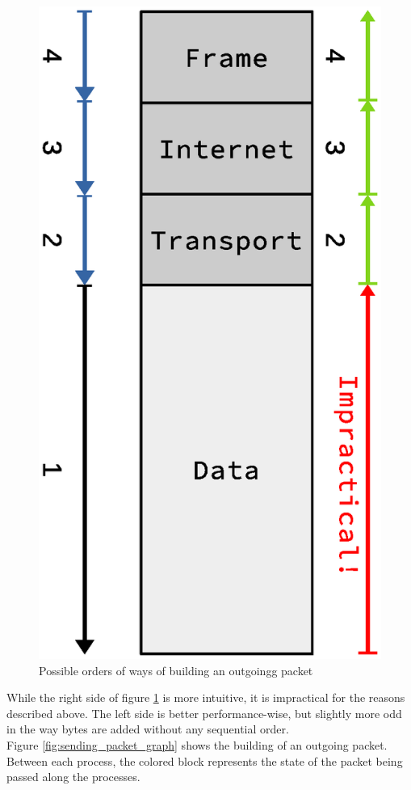\begin{figure}
    \centering
    \includegraphics[scale=0.45]{design/sending_packet_order.eps}
    \caption{Possible orders of ways of building an outgoingg packet}
    \label{fig:sending_packet_order}
\end{figure}

While the right side of figure \ref{fig:sending_packet_order} is more intuitive,
it is impractical for the reasons described above. The left side is better 
performance-wise, but slightly more odd in the way bytes are added without any 
sequential order.\\
Figure \ref{fig:sending_packet_graph} shows the building of an outgoing packet.
Between each process, the colored block represents the state of the packet 
being passed along the processes.  

